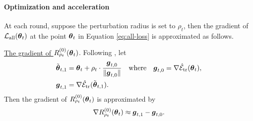 \paragraph{Optimization and acceleration}
At each round, suppose the perturbation radius is set to $\rho_t$, then the gradient of $\mathcal{L}_{\text{all}}(\boldsymbol{\theta}_t)$ at the point $\boldsymbol{\theta}_t$ in Equation \eqref{eq:all-loss} is approximated as follows.

\noindent \underline{The gradient of $R^{(0)}_{\rho_t}(\boldsymbol{\theta}_t)$}. Following \cite{foret2021sharpness}, let
\begin{equation}
    \begin{aligned}
        \tilde{\boldsymbol{\theta}}_{t, 1} & = \boldsymbol{\theta}_t + \rho_t \cdot \frac{\boldsymbol{g}_{t,0}}{\|\boldsymbol{g}_{t,0}\|} \quad \text{where} \quad \boldsymbol{g}_{t,0} = \nabla \hat{\mathcal{E}}_{{\text{tr}}} (\boldsymbol{\theta}_t), \\
        \boldsymbol{g}_{t,1} & = \nabla \hat{\mathcal{E}}_{{\text{tr}}}(\tilde{\boldsymbol{\theta}}_{t,1}).
    \end{aligned}
\end{equation}
Then the gradient of $R^{(0)}_{\rho_t}(\boldsymbol{\theta}_t)$ is approximated by
\begin{equation} \label{eq:gradient-sam}
    \nabla R^{(0)}_{\rho_t}(\boldsymbol{\theta}_t) \approx \boldsymbol{g}_{t,1} - \boldsymbol{g}_{t,0}.
\end{equation}

